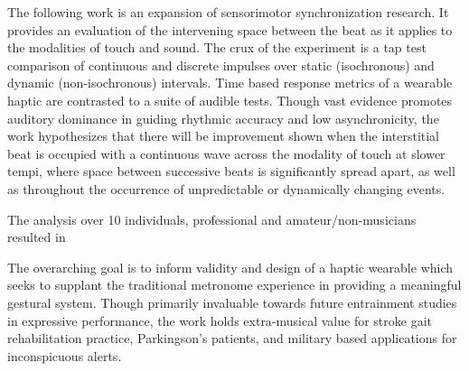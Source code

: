 
\setlength{\parskip}{1em}
\setlength{\parindent}{0em}

\noindent
\listoftodos
\pagebreak


The following work is an expansion of sensorimotor synchronization research. It provides an evaluation of the intervening space between the beat as it applies to the modalities of touch and sound. The crux of the experiment is a tap test comparison of continuous and discrete impulses over static (isochronous) and dynamic (non-isochronous) intervals. Time based response metrics of a wearable haptic are contrasted to a suite of audible tests. Though vast evidence promotes auditory dominance in guiding rhythmic accuracy and low asynchronicity, the work hypothesizes that there will be improvement shown when the interstitial beat is occupied with a continuous wave across the modality of touch at slower tempi, where space between successive beats is significantly spread apart, as well as throughout the occurrence of unpredictable or dynamically changing events. 

The analysis over 10 individuals, professional and amateur/non-musicians resulted in 


The overarching goal is to inform validity and design of a haptic wearable which seeks to supplant the traditional metronome experience in providing a meaningful gestural system. Though primarily invaluable towards future entrainment studies in expressive performance, the work holds extra-musical value for stroke gait rehabilitation practice, Parkingson's patients, and military based  applications for inconspicuous alerts.